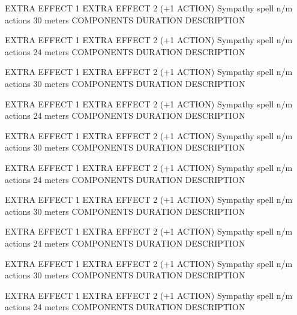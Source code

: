         EXTRA EFFECT 1
        EXTRA EFFECT 2 (+1 ACTION)
        {Sympathy spell}
        {n/m actions}
        {30 meters}
        {COMPONENTS}
        {DURATION}
        DESCRIPTION

        EXTRA EFFECT 1
        EXTRA EFFECT 2 (+1 ACTION)
        {Sympathy spell}
        {n/m actions}
        {24 meters}
        {COMPONENTS}
        {DURATION}
        DESCRIPTION

        EXTRA EFFECT 1
        EXTRA EFFECT 2 (+1 ACTION)
        {Sympathy spell}
        {n/m actions}
        {30 meters}
        {COMPONENTS}
        {DURATION}
        DESCRIPTION

        EXTRA EFFECT 1
        EXTRA EFFECT 2 (+1 ACTION)
        {Sympathy spell}
        {n/m actions}
        {24 meters}
        {COMPONENTS}
        {DURATION}
        DESCRIPTION

        EXTRA EFFECT 1
        EXTRA EFFECT 2 (+1 ACTION)
        {Sympathy spell}
        {n/m actions}
        {30 meters}
        {COMPONENTS}
        {DURATION}
        DESCRIPTION

        EXTRA EFFECT 1
        EXTRA EFFECT 2 (+1 ACTION)
        {Sympathy spell}
        {n/m actions}
        {24 meters}
        {COMPONENTS}
        {DURATION}
        DESCRIPTION

        EXTRA EFFECT 1
        EXTRA EFFECT 2 (+1 ACTION)
        {Sympathy spell}
        {n/m actions}
        {30 meters}
        {COMPONENTS}
        {DURATION}
        DESCRIPTION

        EXTRA EFFECT 1
        EXTRA EFFECT 2 (+1 ACTION)
        {Sympathy spell}
        {n/m actions}
        {24 meters}
        {COMPONENTS}
        {DURATION}
        DESCRIPTION

        EXTRA EFFECT 1
        EXTRA EFFECT 2 (+1 ACTION)
        {Sympathy spell}
        {n/m actions}
        {30 meters}
        {COMPONENTS}
        {DURATION}
        DESCRIPTION

        EXTRA EFFECT 1
        EXTRA EFFECT 2 (+1 ACTION)
        {Sympathy spell}
        {n/m actions}
        {24 meters}
        {COMPONENTS}
        {DURATION}
        DESCRIPTION


